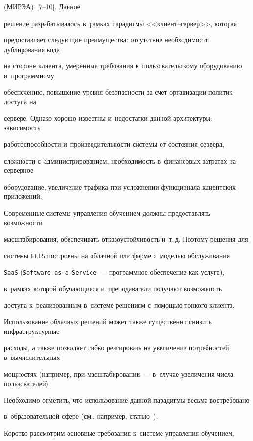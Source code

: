 (МИРЭА)~[7--10]. Данное 


решение разрабатывалось в~рамках парадигмы <<кли\-ент--сер\-вер>>, которая 


предоставляет следующие преимущества: отсутствие необходимости дублирования кода 


на стороне клиента, умеренные требования к~пользовательскому оборудованию и~программному 


обеспечению, повышение уровня безопасности за счет организации политик доступа на 


сервере. Однако хорошо известны и~недостатки данной архитектуры: зависимость 


работоспособности и~производительности системы от состояния сервера, 


сложности с~администрированием, необходимость в~финансовых затратах на серверное 


оборудование, увеличение трафика при усложнении функционала клиентских приложений.





Современные системы управления обучением должны предоставлять возможности 


масштабирования, обеспечивать отказоустойчивость и~т.\,д. Поэтому решения для 


системы \verb"ELIS" построены на облачной платформе с~моделью обслуживания 


\verb"SaaS" (\verb"Software-as-a-Service"~--- программное обеспечение как услуга), 


в~рамках которой обучающиеся и~преподаватели получают возможность 


доступа к~реализованным в~системе решениям  с~по\-мощью тонкого клиента. 


Использование облачных решений может также существенно снизить инфраструктурные 


расходы, а также позволяет гибко реагировать на увеличение потребностей в~вычислительных 


мощностях (например, при масштабировании~--- в~случае увеличения числа пользователей). 


Необходимо отметить, что использование данной парадигмы весьма востребовано 


в~образовательной сфере (см., например, статью~\cite{Sultan2010}).








Коротко рассмотрим основные требования к~системе управления обучением, 


